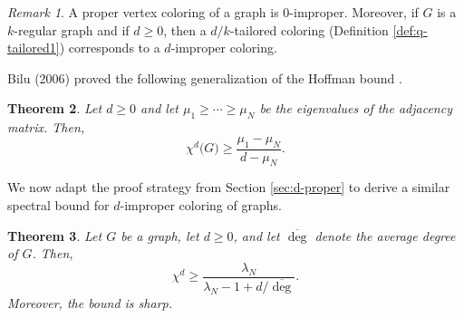 \documentclass{article}
\theoremstyle{plain}
\newtheorem{theorem}{Theorem}[section]
\theoremstyle{definition}
\theoremstyle{remark}
\newtheorem{remark}[theorem]{Remark}
\begin{document}
\begin{remark}
   A proper vertex coloring of a graph is $0$-improper. Moreover, if $G$ is a $k$-regular graph and if $d\geq0$, then a $d/k$-tailored coloring (Definition \ref{def:q-tailored1}) corresponds to a $d$-improper coloring.
\end{remark}
Bilu (2006) \cite{Bilu2006} proved the following generalization of the Hoffman bound \cite{Hoffman1970}.
\begin{theorem}
    Let $d\geq0$ and let $\mu_1\geq \cdots \geq \mu_N$ be the eigenvalues of the adjacency matrix. Then,
    \begin{equation}\label{eq:d-improperA}
        \chi^d\bigl(G\bigr) \geq \frac{\mu_1-\mu_N}{d-\mu_N}.
    \end{equation}
\end{theorem}
We  now adapt the proof strategy from Section \ref{sec:d-proper} to derive a similar spectral bound for $d$-improper coloring of graphs.
\begin{theorem}\label{thm:d-improper}
    Let $G$ be a graph, let $d\geq 0$, and let $\overline{\deg}$ denote the average degree of $G$. Then,
    \begin{equation}\label{eq:d-improperNL}
        \chi^d \geq \frac{\lambda_N}{\lambda_N-1+d/\overline{\deg}}.
    \end{equation}
    Moreover, the bound is sharp. 
\end{theorem}
\end{document}
